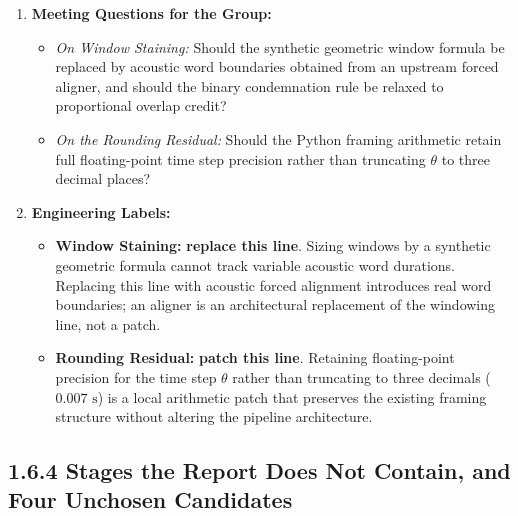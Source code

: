 \documentclass[11pt,a4paper]{article}
\begin{document}
\begin{enumerate}
    \item \textbf{Meeting Questions for the Group:}
    \begin{itemize}
        \item \textit{On Window Staining:} Should the synthetic geometric window formula be replaced by acoustic word boundaries obtained from an upstream forced aligner, and should the binary condemnation rule be relaxed to proportional overlap credit?
        \item \textit{On the Rounding Residual:} Should the Python framing arithmetic retain full floating-point time step precision rather than truncating $\theta$ to three decimal places?
    \end{itemize}
    \item \textbf{Engineering Labels:}
    \begin{itemize}
        \item \textbf{Window Staining:} \textbf{replace this line}. Sizing windows by a synthetic geometric formula cannot track variable acoustic word durations. Replacing this line with acoustic forced alignment introduces real word boundaries; an aligner is an architectural replacement of the windowing line, not a patch.
        \item \textbf{Rounding Residual:} \textbf{patch this line}. Retaining floating-point precision for the time step $\theta$ rather than truncating to three decimals ($0.007\text{ s}$) is a local arithmetic patch that preserves the existing framing structure without altering the pipeline architecture.
    \end{itemize}
\end{enumerate}

\subsection*{1.6.4 Stages the Report Does Not Contain, and Four Unchosen Candidates}
\end{document}
